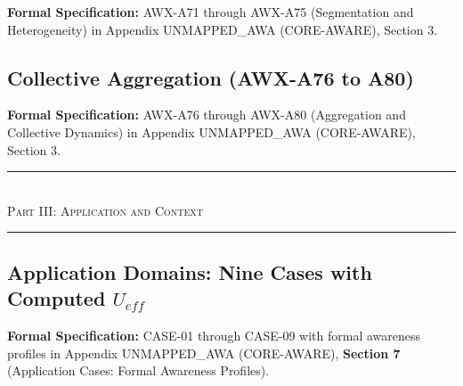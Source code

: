 

\begin{cross-reference}
\textbf{Formal Specification:} AWX-A71 through AWX-A75 (Segmentation and Heterogeneity) in
Appendix UNMAPPED_AWA (CORE-AWARE), Section 3.
\end{cross-reference}

\subsection{Collective Aggregation (AWX-A76 to A80)}
\label{subsec:11-14-aggregation}



\begin{cross-reference}
\textbf{Formal Specification:} AWX-A76 through AWX-A80 (Aggregation and Collective Dynamics) in
Appendix UNMAPPED_AWA (CORE-AWARE), Section 3.
\end{cross-reference}



\begin{center}
\rule{0.8\textwidth}{0.4pt}\\[0.5em]
{\large\textsc{Part III: Application and Context}}\\[0.3em]
\rule{0.8\textwidth}{0.4pt}
\end{center}

\subsection{Application Domains: Nine Cases with Computed $U_{eff}$}
\label{subsec:11-15-applications}



\begin{cross-reference}
\textbf{Formal Specification:} CASE-01 through CASE-09 with formal awareness profiles in
Appendix UNMAPPED_AWA (CORE-AWARE), \textbf{Section 7} (Application Cases: Formal Awareness Profiles).
\end{cross-reference}

